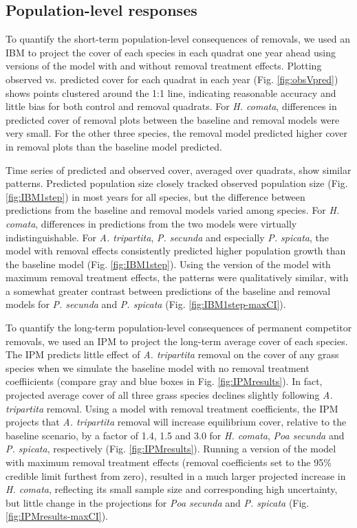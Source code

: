 \documentclass[11pt]{article}
\begin{document}
\begin{doublespacing}
\subsection*{Population-level responses}

To quantify the short-term population-level consequences of removals, we used an IBM to project the cover of each species in each quadrat one year ahead using versions of the model with and without removal treatment effects. Plotting observed vs. predicted cover for each quadrat in each year (Fig. \ref{fig:obsVpred}) shows points clustered around the 1:1 line, indicating reasonable accuracy and little bias for both control and removal quadrats. For \textit{H. comata}, differences in predicted cover of removal plots between the baseline and removal models were very small. For the other three species, the removal model predicted higher cover in removal plots than the baseline model predicted.
 
Time series of predicted and observed cover, averaged over quadrats, show similar patterns. Predicted population size closely tracked observed population size (Fig. \ref{fig:IBM1step}) in most years for all species, but the difference between predictions from the baseline and removal models varied among species. For \textit{H. comata}, differences in predictions from the two models were virtually indistinguishable. For \textit{A. tripartita}, \textit{P. secunda} and especially \textit{P. spicata}, the model with removal effects consistently predicted higher population growth than the baseline model (Fig. \ref{fig:IBM1step}). Using the version of the model with maximum removal treatment effects, the patterns were qualitatively similar, with a somewhat greater contrast between predictions of the baseline and removal models for \textit{P. secunda} and \textit{P. spicata} (Fig. \ref{fig:IBM1step-maxCI}). 
 
To quantify the long-term population-level consequences of permanent competitor removals, we used an IPM to project the long-term average cover of each species. The IPM predicts little effect of \textit{A. tripartita} removal on the cover of any grass species when we simulate the baseline model with no removal treatment coeffiicients (compare gray and blue boxes in Fig. \ref{fig:IPMresults}). In fact, projected average cover of all three grass species declines slightly following \textit{A. tripartita} removal. 
Using a model with removal treatment coefficients, the IPM projects that \textit{A. tripartita} removal will increase equilibrium cover, relative to the baseline scenario, by a factor of 1.4, 1.5 and 3.0 for \textit{H. comata}, \textit{Poa secunda} and \textit{P. spicata}, respectively (Fig. \ref{fig:IPMresults}). 
Running a version of the model with maximum removal treatment effects (removal coefficients set to the 95\% credible limit furthest from zero), resulted in a much larger projected increase in \textit{H. comata}, reflecting its small sample size and corresponding high uncertainty, but little change in the projections for \textit{Poa secunda} and \textit{P. spicata} (Fig. \ref{fig:IPMresults-maxCI}). 


\end{doublespacing}
\end{document}
